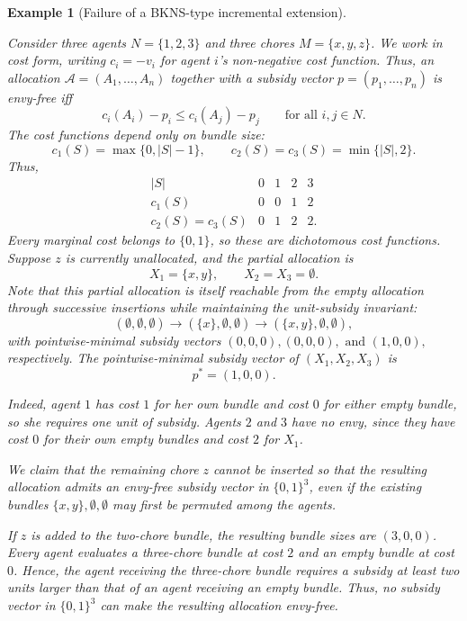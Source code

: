 \documentclass[sigconf,anonymous]{aamas}
\theoremstyle{acmplain}
\theoremstyle{acmdefinition}
\newtheorem{example}[theorem]{Example}
\theoremstyle{acmplain}
\begin{document}
\begin{example}[Failure of a BKNS-type incremental extension]
\label{app:extension-failure}

Consider three agents $N=\{1,2,3\}$ and three chores $M=\{x,y,z\}$. We work in cost form, writing
\( c_i=-v_i \)
for agent \(i\)'s non-negative cost function. Thus, an allocation \(\mathcal A=(A_1,\ldots,A_n)\) together with a subsidy vector \(p=(p_1,\ldots,p_n)\) is envy-free iff
\[ c_i(A_i)-p_i\le c_i(A_j)-p_j
\qquad\text{for all } i,j\in N.
\]
The cost functions depend only on bundle size: \[ c_1(S)=\max\{0,|S|-1\}, \qquad c_2(S)=c_3(S)=\min\{|S|,2\}. \] Thus, \[
\begin{array}{c|cccc}
|S| & 0 & 1 & 2 & 3\\
\hline
c_1(S) & 0 & 0 & 1 & 2\\
c_2(S)=c_3(S) & 0 & 1 & 2 & 2 .
\end{array}
\] Every marginal cost belongs to $\{0,1\}$, so these are dichotomous cost functions. Suppose  $z$ is currently unallocated, and the partial allocation is \[
X_1=\{x,y\},
\qquad
X_2=X_3=\emptyset.
\] Note that this partial allocation is itself reachable from the empty allocation through successive insertions while maintaining the unit-subsidy invariant:
\[
(\emptyset,\emptyset,\emptyset)
\longrightarrow
(\{x\},\emptyset,\emptyset)
\longrightarrow
(\{x,y\},\emptyset,\emptyset),
\] with pointwise-minimal subsidy vectors
\(
(0,0,0), (0,0,0),\text{ and } (1,0,0),
\) respectively. The pointwise-minimal subsidy vector of $(X_1,X_2,X_3)$ is \[
p^*=(1,0,0).
\]

Indeed, agent $1$ has cost $1$ for her own bundle and cost $0$ for either empty bundle, so she requires one unit of subsidy. Agents $2$ and $3$ have no envy, since they have cost $0$ for their own empty bundles and cost $2$ for $X_1$.

We claim that the remaining chore $z$ cannot be inserted so that the resulting allocation admits an envy-free subsidy vector in $\{0,1\}^3$, even if the existing bundles $\{x,y\},\emptyset,\emptyset$ may first be permuted among the agents.

If $z$ is added to the two-chore bundle, the resulting bundle sizes are $(3,0,0)$. Every agent evaluates a three-chore bundle at cost $2$ and an empty bundle at cost $0$. Hence, the agent receiving the three-chore bundle requires a subsidy at least two units larger than that of an agent receiving an empty bundle. Thus, no subsidy vector in $\{0,1\}^3$ can make the resulting allocation envy-free.


\end{example}
\end{document}
